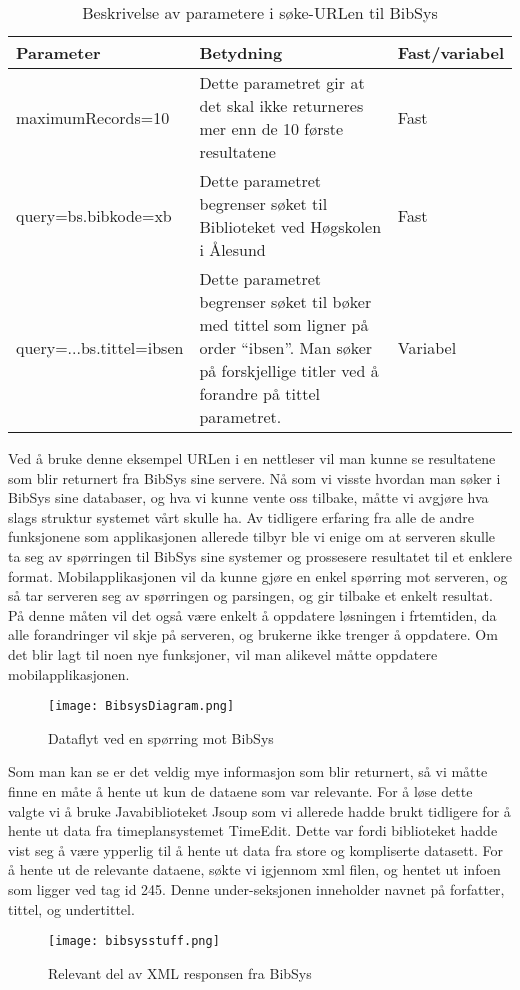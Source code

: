 \documentclass[../main.tex]{subfiles}
\begin{document}
\begin{table}[H]
\begin{center}
\caption{Beskrivelse av parametere i søke-URLen til BibSys}
  \begin{tabular}{ | p{4cm} | p{8cm} | p{2cm} |}
    \hline
    Parameter & Betydning & Fast/variabel \\ \hline
    maximumRecords=10 & Dette parametret gir at det skal ikke returneres mer enn de 10 første resultatene & Fast \\ \hline
    query=bs.bibkode=xb & Dette parametret begrenser søket til Biblioteket ved Høgskolen i Ålesund & Fast \\ \hline
    query=...bs.tittel=ibsen & Dette parametret begrenser søket til bøker med tittel som ligner på order “ibsen”. Man søker på forskjellige titler ved å forandre på tittel parametret. & Variabel \\
    \hline
  \end{tabular}
\end{center}
\end{table}

Ved å bruke denne eksempel URLen i en nettleser vil man kunne se resultatene som blir returnert fra BibSys sine servere.\newline
\newline
Nå som vi visste hvordan man søker i BibSys sine databaser, og hva vi kunne vente oss tilbake, måtte vi avgjøre hva slags struktur systemet vårt skulle ha. Av tidligere erfaring fra alle de andre funksjonene som applikasjonen allerede tilbyr ble vi enige om at serveren skulle ta seg av spørringen til BibSys sine systemer og prossesere resultatet til et enklere format. Mobilapplikasjonen vil da kunne gjøre en enkel spørring mot serveren, og så tar serveren seg av spørringen og parsingen, og gir tilbake et enkelt resultat. På denne måten vil det også være enkelt å oppdatere løsningen i frtemtiden, da alle forandringer vil skje på serveren, og brukerne ikke trenger å oppdatere. Om det blir lagt til noen nye funksjoner, vil man alikevel måtte oppdatere mobilapplikasjonen.

\begin{figure}[H]
  \centering
  \texttt{[image: BibsysDiagram.png]}
  \caption{Dataflyt ved en spørring mot BibSys}
\end{figure}

Som man kan se er det veldig mye informasjon som blir returnert, så vi måtte finne en måte å hente ut kun de dataene som var relevante. For å løse dette valgte vi å bruke Javabiblioteket Jsoup som vi allerede hadde brukt tidligere for å hente ut data fra timeplansystemet TimeEdit. Dette var fordi biblioteket hadde vist seg å være ypperlig til å hente ut data fra store og kompliserte datasett.\newline
\newline
For å hente ut de relevante dataene, søkte vi igjennom xml filen, og hentet ut infoen som ligger ved tag id 245. Denne under-seksjonen inneholder navnet på forfatter, tittel, og undertittel.
\begin{figure}[H]
  \centering
  \texttt{[image: bibsysstuff.png]}
  \caption{Relevant del av XML responsen fra BibSys}
\end{figure}
\end{document}
